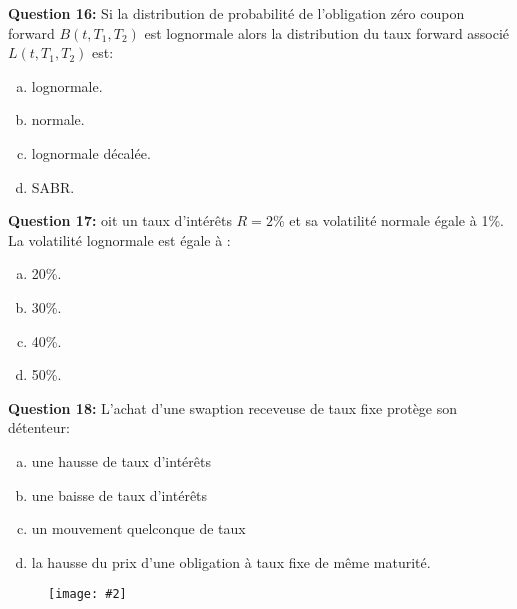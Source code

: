 \documentclass{article}
\newcommand{\FIG}[2]{\texttt{[image: \#2]}}
\newcommand{\indentitem}{\setlength\itemindent{25pt}}
\begin{document}
\textbf{Question 16:}
Si la distribution de probabilité de l’obligation zéro coupon forward $B(t,T_1,T_2)$ est lognormale alors la distribution du taux forward associé $L(t,T_1,T_2)$ est:
\begin{enumerate}[a)]
\indentitem \item lognormale.
\indentitem \item normale.
\indentitem \item lognormale décalée.
\indentitem \item SABR.
\end{enumerate}
\textbf{Question 17:}
oit un taux d’intérêts $R=2\%$ et sa volatilité normale égale à 1\%. La volatilité lognormale est égale à :
\begin{enumerate}[a)]
\indentitem \item 20\%.
\indentitem \item 30\%.
\indentitem \item 40\%.
\indentitem \item 50\%.
\end{enumerate}

\textbf{Question 18:}
L’achat d’une swaption receveuse de taux fixe protège son détenteur:
\begin{enumerate}[a)]
\indentitem \item une hausse de taux d’intérêts
\indentitem \item une baisse de taux d’intérêts
\indentitem \item un mouvement quelconque de taux
\indentitem \item la hausse du prix d’une obligation à taux fixe de même maturité.
\end{enumerate}

\begin{figure}[H]
\FIG{15cm}{figures/schema_swaption.jpg}
\end{figure}
\end{document}
